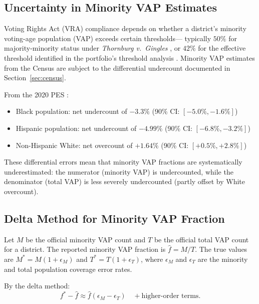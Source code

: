 
\subsection{Uncertainty in Minority VAP Estimates}

Voting Rights Act (VRA) compliance depends on whether a district's
minority voting-age population (VAP) exceeds certain thresholds---
typically $50\%$ for majority-minority status under \textit{Thornburg
v.\ Gingles} \citep{gingles1986}, or $42\%$ for the effective
threshold identified in the portfolio's threshold analysis
\citep{dellalibera2026d1}. Minority VAP estimates from the Census
are subject to the differential undercount documented in
Section~\ref{sec:census}.

From the 2020 PES \citep{uscensusbureau2022net}:
\begin{itemize}
  \item Black population: net undercount of $-3.3\%$
    (90\% CI: $[-5.0\%, -1.6\%]$)
  \item Hispanic population: net undercount of $-4.99\%$
    (90\% CI: $[-6.8\%, -3.2\%]$)
  \item Non-Hispanic White: net overcount of $+1.64\%$
    (90\% CI: $[+0.5\%, +2.8\%]$)
\end{itemize}

These differential errors mean that minority VAP fractions are
systematically underestimated: the numerator (minority VAP) is
undercounted, while the denominator (total VAP) is less severely
undercounted (partly offset by White overcount).

\subsection{Delta Method for Minority VAP Fraction}

Let $M$ be the official minority VAP count and $T$ be the official
total VAP count for a district. The reported minority VAP fraction is
$\hat{f} = M/T$. The true values are $M^* = M(1+\epsilon_M)$ and
$T^* = T(1+\epsilon_T)$, where $\epsilon_M$ and $\epsilon_T$ are
the minority and total population coverage error rates.

By the delta method:
\begin{equation}
  f^* - \hat{f} \approx \hat{f}(\epsilon_M - \epsilon_T)
  \quad + \text{higher-order terms}.
\end{equation}

